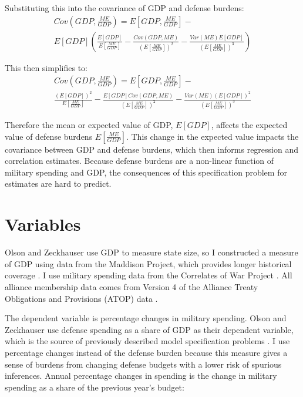 \documentclass[12pt]{article}
\begin{document}
Substituting this into the covariance of GDP and defense burdens:
\begin{multline}
Cov\left(GDP, \frac{ME}{GDP} \right) = E\left[GDP, \frac{ME}{GDP} \right] - \\ E[GDP] \left( \frac{E[GDP]}{E\left[\frac{ME}{GDP} \right]} - \frac{Cov(GDP, ME)}{\left(E\left[\frac{ME}{GDP} \right]\right)^2} - \frac{Var(ME) E[GDP]}{\left(E\left[\frac{ME}{GDP} \right]\right)^3} \right)
\end{multline}

This then simplifies to:
\begin{multline}
Cov\left(GDP, \frac{ME}{GDP} \right) = E\left[GDP, \frac{ME}{GDP} \right] - \\ \frac{(E[GDP])^2}{E\left[\frac{ME}{GDP} \right]} - \frac{E[GDP] Cov(GDP, ME)}{\left(E\left[\frac{ME}{GDP} \right]\right)^2} - \frac{Var(ME) (E[GDP])^2}{\left(E\left[\frac{ME}{GDP} \right]\right)^3}
\end{multline}

Therefore the mean or expected value of GDP, $E[GDP]$, affects the expected value of defense burdens $E\left[\frac{ME}{GDP} \right]$.
This change in the expected value impacts the covariance between GDP and defense burdens, which then informs regression and correlation estimates.  
Because defense burdens are a non-linear function of military spending and GDP, the consequences of this specification problem for estimates are hard to predict. 


\section{Variables} 


Olson and Zeckhauser use GDP to measure state size, so I constructed a measure of GDP using data from the Maddison Project, which provides longer historical coverage \citep{Boltetal2018}. 
I use military spending data from the Correlates of War Project \citep{SingerCINC1988}.  
All alliance membership data comes from Version 4 of the Alliance Treaty Obligations and Provisions (ATOP) data \citep{Leedsetal2002}.  


The dependent variable is percentage changes in military spending. 
Olson and Zeckhauser use defense spending as a share of GDP as their dependent variable, which is the source of previously described model specification problems \citep{PluemperNeumayer2015}. 
I use percentage changes instead of the defense burden because this measure gives a sense of burdens from changing defense budgets with a lower risk of spurious inferences. 
Annual percentage changes in spending is the change in military spending as a share of the previous year's budget:
\end{document}
